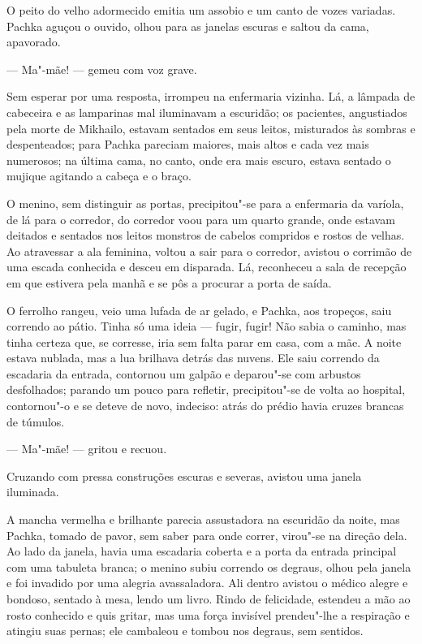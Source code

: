 O peito do velho adormecido emitia um assobio e um canto de vozes
variadas. Pachka aguçou o ouvido, olhou para as janelas escuras e saltou
da cama, apavorado.

--- Ma"-mãe! --- gemeu com voz grave.

Sem esperar por uma resposta, irrompeu na enfermaria vizinha. Lá, a
lâmpada de cabeceira e as lamparinas mal iluminavam a escuridão; os
pacientes, angustiados pela morte de Mikhailo, estavam sentados em seus
leitos, misturados às sombras e despenteados; para Pachka pareciam
maiores, mais altos e cada vez mais numerosos; na última cama, no canto,
onde era mais escuro, estava sentado o mujique agitando a cabeça e o
braço.

O menino, sem distinguir as portas, precipitou"-se para a enfermaria da
varíola, de lá para o corredor, do corredor voou para um quarto grande,
onde estavam deitados e sentados nos leitos monstros de cabelos
compridos e rostos de velhas. Ao atravessar a ala feminina, voltou a
sair para o corredor, avistou o corrimão de uma escada conhecida e
desceu em disparada. Lá, reconheceu a sala de recepção em que estivera
pela manhã e se pôs a procurar a porta de saída.

O ferrolho rangeu, veio uma lufada de ar gelado, e Pachka, aos tropeços,
saiu correndo ao pátio. Tinha só uma ideia --- fugir, fugir! Não sabia o
caminho, mas tinha certeza que, se corresse, iria sem falta parar em
casa, com a mãe. A noite estava nublada, mas a lua brilhava detrás das
nuvens. Ele saiu correndo da escadaria da entrada, contornou um galpão e
deparou"-se com arbustos desfolhados; parando um pouco para refletir,
precipitou"-se de volta ao hospital, contornou"-o e se deteve de novo,
indeciso: atrás do prédio havia cruzes brancas de túmulos.

--- Ma"-mãe! --- gritou e recuou.

Cruzando com pressa construções escuras e severas, avistou uma janela
iluminada.

A mancha vermelha e brilhante parecia assustadora na escuridão da noite,
mas Pachka, tomado de pavor, sem saber para onde correr, virou"-se na
direção dela. Ao lado da janela, havia uma escadaria coberta e a porta
da entrada principal com uma tabuleta branca; o menino subiu correndo os
degraus, olhou pela janela e foi invadido por uma alegria avassaladora.
Ali dentro avistou o médico alegre e bondoso, sentado à mesa, lendo um
livro. Rindo de felicidade, estendeu a mão ao rosto conhecido e quis
gritar, mas uma força invisível prendeu"-lhe a respiração e atingiu suas
pernas; ele cambaleou e tombou nos degraus, sem sentidos.

